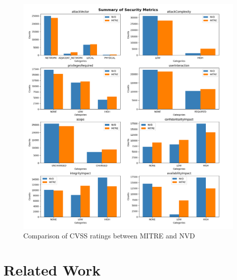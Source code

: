 \documentclass[12pt]{article}
\begin{document}
\begin{figure}
	\centering
	\includegraphics[width=1\textwidth]{figures/combined_overlap.png}
	\caption{\label{fig:counts}Comparison of CVSS ratings between MITRE and NVD}
\end{figure}

\section{Related Work}
\end{document}
